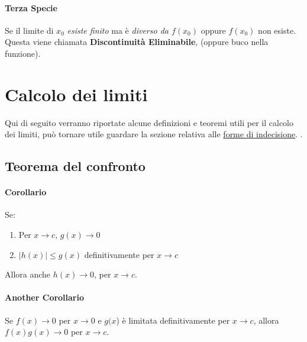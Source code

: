 \documentclass[12pt, a4paper, openany]{book}
\begin{document}
	\paragraph{Terza Specie} Se il limite di $x_0$ \emph{esiste finito} ma è \emph{diverso da $f(x_0)$} oppure $f(x_0)$ non esiste.
	Questa viene chiamata \textbf{Discontinuità Eliminabile}, (oppure buco nella funzione).

	\section{Calcolo dei limiti}
	Qui di seguito verranno riportate alcune definizioni e teoremi utili per il calcolo 
	dei limiti, può tornare utile guardare la sezione relativa alle
	\hyperref[sec:forme_di_indecisione]{forme di indecisione}. 
	. 
	\subsection*{Teorema del confronto}
	\paragraph*{Corollario} Se:
	\begin{enumerate}
		\item Per $x \rightarrow c, \, g(x) \rightarrow 0$
		\item $|h(x)|\leq g(x)$ definitivamente per $x \rightarrow c$
	\end{enumerate}
	Allora anche $h(x) \rightarrow 0$, per $x\rightarrow c$.
	\paragraph*{Another Corollario}Se $f(x) \rightarrow 0$ per $x \rightarrow 0$ e $g(x$)
	è limitata definitivamente per $x \rightarrow c$, allora $f(x)g(x) \rightarrow 0$
	per $x \rightarrow c$.
\end{document}
